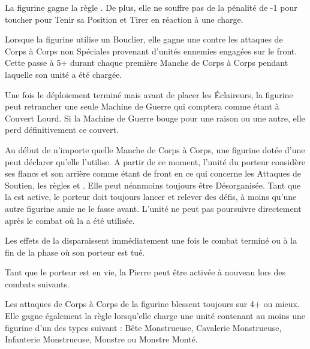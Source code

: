 \armyspecialruleentry{\sturdy}

La figurine gagne la règle \thunderouscharge{}. De plus, elle ne souffre pas de la pénalité de -1 pour toucher pour Tenir sa Position et Tirer en réaction à une charge. 

\armyspecialruleentry{\shieldwall}

Lorsque la figurine utilise un Bouclier, elle gagne une  contre les attaques de Corps à Corps non Spéciales provenant d'unités ennemies engagées sur le front. Cette \wardsave{} passe à 5+ durant chaque première Manche de Corps à Corps pendant laquelle son unité a été chargée. 

\armyspecialruleentry{\entrench}

Une fois le déploiement terminé mais avant de placer les Éclaireurs, la figurine peut retrancher une seule Machine de Guerre qui comptera comme étant à Couvert Lourd. Si la Machine de Guerre bouge pour une raison ou une autre, elle perd définitivement ce couvert.

\armyspecialruleentry{\holdstone}

Au début de n'importe quelle Manche de Corps à Corps, une figurine dotée d'une \holdstone{} peut déclarer qu'elle l'utilise. A partir de ce moment, l'unité du porteur considère ses flancs et son arrière comme étant de front en ce qui concerne les Attaques de Soutien, les règles \parry{} et \shieldwall{}. Elle peut néanmoins toujours être Désorganisée. Tant que la \holdstone{} est active, le porteur doit toujours lancer et relever des défis, à moins qu'une autre figurine amie ne le fasse avant. L'unité ne peut pas poursuivre directement après le combat où la \holdstone{} a été utilisée.

Les effets de la \holdstone{} disparaissent immédiatement une fois le combat terminé ou à la fin de la phase où son porteur est tué.

Tant que le porteur est en vie, la Pierre peut être activée à nouveau lors des combats suivants.

\armyspecialruleentry{\thebiggertheyare}

Les attaques de Corps à Corps de la figurine blessent toujours sur 4+ ou mieux. Elle gagne également la règle \swiftstride{} lorsqu'elle charge une unité contenant au moins une figurine d'un des types suivant : Bête Monstrueuse, Cavalerie Monstrueuse, Infanterie Monstrueuse, Monstre ou Monstre Monté.

\armyspecialruleentry{\comewithme}

